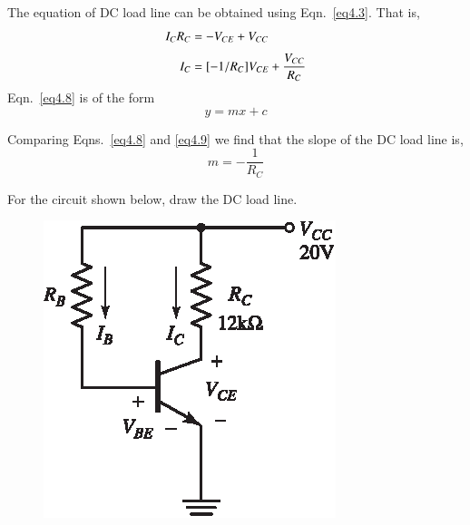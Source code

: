 The equation of DC load line can be obtained using Eqn.~\eqref{eq4.3}. That is,
\begin{align}
I_{C}R_{C} &= -V_{CE}+V_{CC}\notag\\[3pt]
I_{C} &= [-1/R_{C}]V_{CE}+\frac{V_{CC}}{R_{C}}\label{eq4.8}
\end{align}
Eqn.~\eqref{eq4.8} is of the form
\begin{equation}
y=mx+c\label{eq4.9}
\end{equation}

Comparing Eqns.~\eqref{eq4.8} and \eqref{eq4.9} we find that the slope of the DC load line is,
\begin{equation}
m=-\dfrac{1}{R_{C}}\label{eq4.10}
\end{equation}

\begin{example}\label{exam4.1}
For the circuit shown below, draw the DC load line.
\begin{figure}[H]
\centering
\includegraphics[scale=1.05]{chap3/S3-EE-03-IN001.eps}
\end{figure}
\end{example}

